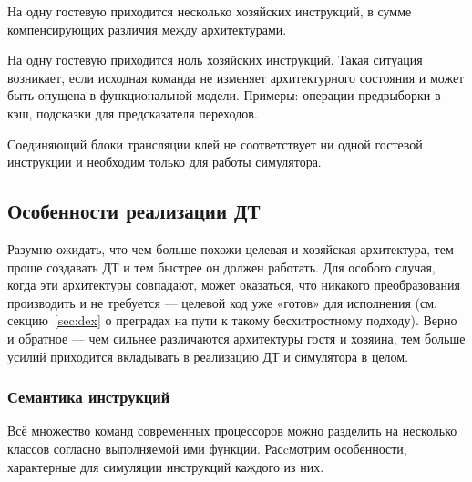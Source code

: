 \begin{enumerate*}
    \item На одну гостевую приходится несколько хозяйских инструкций, в сумме компенсирующих различия между архитектурами.
    \item На одну гостевую приходится ноль хозяйских инструкций. Такая ситуация возникает, если исходная команда не изменяет архитектурного состояния и может быть опущена в функциональной модели. Примеры: операции предвыборки в кэш, подсказки для предсказателя переходов.
    \item Соединяющий блоки трансляции клей не соответствует ни одной гостевой инструкции и необходим только для работы симулятора.
\end{enumerate*}


\subsection{Особенности реализации ДТ}

Разумно ожидать, что чем больше похожи целевая и хозяйская архитектура, тем проще создавать ДТ и тем быстрее он должен работать. Для особого случая, когда эти архитектуры совпадают, может оказаться, что никакого преобразования производить и не требуется --- целевой код уже «готов» для исполнения (см. секцию~\ref{sec:dex} о  преградах на пути к такому бесхитростному подходу). Верно и обратное --- чем сильнее различаются архитектуры гостя и хозяина, тем больше усилий приходится вкладывать в реализацию ДТ и симулятора в целом.

\subsubsection{Семантика инструкций}

Всё множество команд современных процессоров можно разделить на несколько классов согласно выполняемой ими функции. Расcмотрим особенности, характерные для симуляции инструкций каждого из них.

